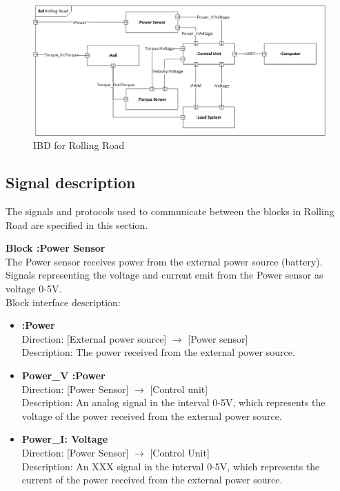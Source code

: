 \begin{figure}[H]
	\centering
	\includegraphics[width=0.9\linewidth]{Architecture/IBD_RollingRoad}
	\caption{IBD for Rolling Road}
	\label{fig:RR_IBD}
\end{figure}

\subsection{Signal description}
The signals and protocols used to communicate between the blocks in Rolling Road are specified in this section.

\textbf{Block :Power Sensor}\\
The Power sensor receives power from the external power source (battery). Signals representing the voltage and current emit from the Power sensor as voltage 0-5V.\\
Block interface description:

\begin{itemize}
	\item \textbf{:Power}\\
		Direction: [External power source] $\rightarrow$ [Power sensor]\\
		Description: The power received from the external power source.
	\item \textbf{Power\_V :Power}\\
		Direction: [Power Sensor] $\rightarrow$ [Control unit]\\
		Description: An analog signal in the interval 0-5V, which represents the voltage of the power received from the external power source.
	\item \textbf{Power\_I: Voltage}\\
		Direction: [Power Sensor] $\rightarrow$ [Control Unit]\\
		Description: An XXX signal in the interval 0-5V, which represents the current of the power received from the external power source.
\end{itemize}

